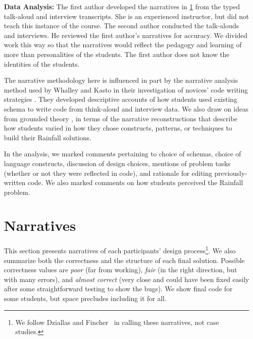 \vskip5pt
\noindent
{\bf Data Analysis:} The first author developed the narratives in
\cref{s:narratives} from the typed talk-aloud and interview
transcripts. She is an experienced \htdp instructor, but did
not teach this instance of the course.  The second author
conducted the talk-alouds and interviews. He
reviewed the first author's narratives for accuracy. We
divided work this way so that the narratives would reflect the pedagogy
and learning of \htdp more than personalities of the students.  The
first author does not know the identities of
the students.

The narrative methodology here is influenced in part by the narrative
analysis method used by Whalley and Kasto in their investigation of novices'
code writing strategies \cite{whalley_qualitative_2014}. They developed
descriptive accounts of how students used existing schema to write code
from think-aloud and interview data. We also draw on ideas from grounded
theory \cite{kinnunen_phenomenography_2012}, in terms of the narrative
reconstructions that describe how students varied in how they chose
constructs, patterns, or techniques to build their Rainfall solutions.

In the analysis, we marked comments pertaining to choice of schemas,
choice of language constructs, discussion of design choices,
mentions of problem tasks
(whether or not they were reflected in code), and rationale for editing
previously-written code.  
We also marked comments on how students perceived the Rainfall
problem.

\section{Narratives}
\label{s:narratives}

This section presents narratives of each participants'
design process\footnote{We follow Dziallas and Fincher~\cite{dziallas_fincher_icer16} in calling these
  narratives, not case studies.}.  We also summarize both the
correctness and the structure of each final solution. Possible correctness values
are \emph{poor} (far from working), \emph{fair} (in the right direction, but with
many errors), and \emph{almost correct} (very close and could have
been fixed easily after some straightforward testing to show the
bugs). We show final code for some students, but space precludes
including it for all.

